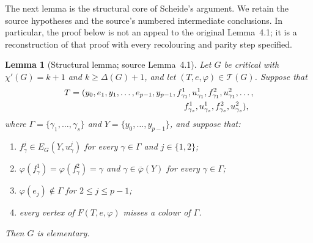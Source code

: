 \documentclass[11pt]{article}
\newtheorem{lemma}[lemma]{Lemma}
\theoremstyle{definition}
\newcommand{\Tcal}{\mathcal T}
\newcommand{\set}[1]{\{#1\}}
\begin{document}
The next lemma is the structural core of Scheide's argument.  We retain the
source hypotheses and the source's numbered intermediate conclusions.  In
particular, the proof below is not an appeal to the original Lemma~4.1; it is
a reconstruction of that proof with every recolouring and parity step
specified.

\begin{lemma}[Structural lemma; source Lemma~4.1]
\label{Scheide-Lemma-4.1}\label{structural-lemma}
Let $G$ be critical with $\chi'(G)=k+1$ and $k\ge\Delta(G)+1$, and let
$(T,e,\varphi)\in\Tcal(G)$. Suppose that
\[
\begin{split}
T={}&(y_0,e_1,y_1,\ldots,e_{p-1},y_{p-1},
 f^1_{\gamma_1},u^1_{\gamma_1},f^2_{\gamma_1},u^2_{\gamma_1},\ldots,\\
&\hspace{42mm}
 f^1_{\gamma_s},u^1_{\gamma_s},f^2_{\gamma_s},u^2_{\gamma_s}),
\end{split}
\]
where $\Gamma=\set{\gamma_1,\ldots,\gamma_s}$ and
$Y=\set{y_0,\ldots,y_{p-1}}$, and suppose that:
\begin{enumerate}[label=\textup{(S\arabic*)},leftmargin=3.2em]
\item $f^j_\gamma\in E_G(Y,u^j_\gamma)$ for every
      $\gamma\in\Gamma$ and $j\in\set{1,2}$;
\item
      $\varphi(f^1_\gamma)=\varphi(f^2_\gamma)=\gamma$ and
      $\gamma\in\overline\varphi(Y)$ for every $\gamma\in\Gamma$;
\item $\varphi(e_j)\notin\Gamma$ for $2\le j\le p-1$;
\item every vertex of $F(T,e,\varphi)$ misses a colour of $\Gamma$.
\end{enumerate}
Then $G$ is elementary.
\end{lemma}
\end{document}
